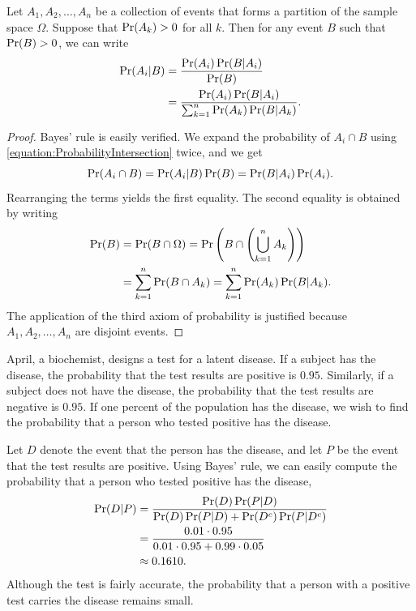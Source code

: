 \begin{theorem}
Let $A_1, A_2, \ldots, A_n$ be a collection of events that forms a partition of the sample space $\Omega$.
Suppose that $\Pr (A_k) > 0$ for all $k$.
Then for any event $B$ such that $\Pr (B) > 0$, we can write
\begin{equation*}
\begin{split}
\Pr (A_i | B)
&= \frac{ \Pr (A_i) \Pr (B | A_i) }{ \Pr (B) } \\
&= \frac{ \Pr (A_i) \Pr (B | A_i) }
{ \sum_{k=1}^n \Pr (A_k) \Pr (B | A_k) } .
\end{split}
\end{equation*}
\end{theorem}
\begin{proof}
Bayes' rule is easily verified.
We expand the probability of $A_i \cap B$ using \eqref{equation:ProbabilityIntersection} twice, and we get
\begin{equation*}
\Pr (A_i \cap B) = \Pr (A_i | B) \Pr (B) = \Pr (B | A_i) \Pr (A_i).
\end{equation*}
Rearranging the terms yields the first equality.
The second equality is obtained by writing
\begin{equation*}
\begin{split}
\Pr (B) &= \Pr (B \cap \Omega)
= \Pr \left( B \cap \left( \bigcup_{k=1}^n A_k \right) \right) \\
&= \sum_{k=1}^n \Pr (B \cap A_k)
= \sum_{k=1}^n \Pr (A_k) \Pr (B | A_k) .
\end{split}
\end{equation*}
The application of the third axiom of probability is justified because $A_1, A_2, \ldots, A_n$ are disjoint events.
\end{proof}

\begin{example}
April, a biochemist, designs a test for a latent disease.
If a subject has the disease, the probability that the test results are positive is $0.95$.
Similarly, if a subject does not have the disease, the probability that the test results are negative is $0.95$.
If one percent of the population has the disease, we wish to find the probability that a person who tested positive has the disease.

Let $D$ denote the event that the person has the disease, and let $P$ be the event that the test results are positive.
Using Bayes' rule, we can easily compute the probability that a person who tested positive has the disease,
\begin{equation*}
\begin{split}
\Pr (D|P)
&= \frac{ \Pr(D) \Pr(P|D) }{ \Pr(D) \Pr(P|D) + \Pr(D^c) \Pr(P|D^c) } \\
&= \frac{ 0.01 \cdot 0.95 }{ 0.01 \cdot 0.95 + 0.99 \cdot 0.05 } \\
&\approx 0.1610 .
\end{split}
\end{equation*}
Although the test is fairly accurate, the probability that a person with a positive test carries the disease remains small.
\end{example}


